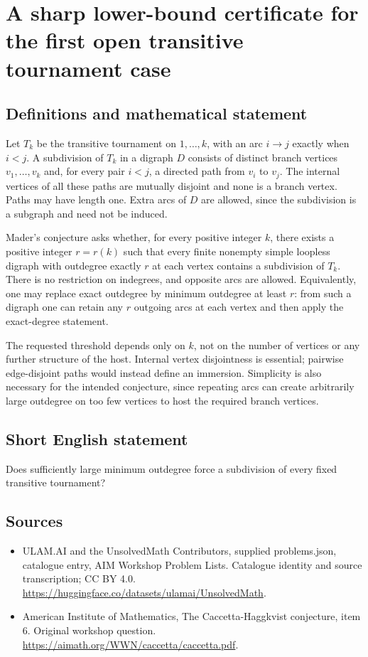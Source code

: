 \documentclass[11pt,a4paper]{article}
\begin{document}
\section*{A sharp lower-bound certificate for the first open transitive tournament case}\label{statement}

\subsection{Definitions and mathematical statement}
Let $T_k$ be the transitive tournament on $1,\ldots,k$, with an arc
$i\to j$ exactly when $i<j$. A subdivision of $T_k$ in a digraph
$D$ consists of distinct branch vertices $v_1,\ldots,v_k$ and, for
every pair $i<j$, a directed path from $v_i$ to $v_j$.
The internal vertices of all these paths are mutually disjoint and
none is a branch vertex. Paths may have length one. Extra arcs of
$D$ are allowed, since the subdivision is a subgraph and need not
be induced.

Mader's conjecture asks whether, for every positive integer $k$,
there exists a positive integer $r=r(k)$ such that every finite
nonempty simple loopless digraph with outdegree exactly $r$ at each
vertex contains a subdivision of $T_k$. There is no restriction on
indegrees, and opposite arcs are allowed. Equivalently, one may
replace exact outdegree by minimum outdegree at least $r$: from
such a digraph one can retain any $r$ outgoing arcs at each vertex
and then apply the exact-degree statement.

The requested threshold depends only on $k$, not on the number of
vertices or any further structure of the host. Internal vertex
disjointness is essential; pairwise edge-disjoint paths would instead
define an immersion. Simplicity is also necessary for the intended
conjecture, since repeating arcs can create arbitrarily large
outdegree on too few vertices to host the required branch vertices.
\subsection{Short English statement}
Does sufficiently large minimum outdegree force a subdivision of every fixed transitive tournament?
\subsection{Sources}
\begin{itemize}
\item[S1] ULAM.AI and the UnsolvedMath Contributors, supplied problems.json, catalogue entry, AIM Workshop Problem Lists. Catalogue identity and source transcription; CC BY 4.0.
\url{https://huggingface.co/datasets/ulamai/UnsolvedMath}.
\item[S2] American Institute of Mathematics, The Caccetta-Haggkvist conjecture, item 6. Original workshop question.
\url{https://aimath.org/WWN/caccetta/caccetta.pdf}.
\end{itemize}
\end{document}
